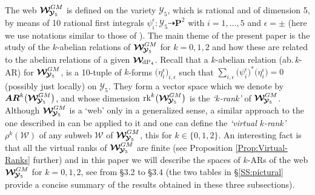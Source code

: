 \documentclass[11pt]{amsart}
\newcommand{\mk}{\medskip}
\begin{document}
  The web $ \boldsymbol{\mathcal W}^{GM}_{ \hspace{-0.05cm}
\boldsymbol{\mathcal Y}_5}$ is defined on the 
variety $\boldsymbol{\mathcal Y}_5$, which is rational and of dimension 5, by means of 10 rational first integrals 
$\psi_i^{\epsilon}: \boldsymbol{\mathcal Y}_5\dashrightarrow  \mathbf P^2$ with $i=1,\ldots,5$ and $\epsilon=\pm $ (here we use notations similar to those of \cite{PirioAFST}).  The main theme of the present paper is the study of the $k$-abelian relations of $ \boldsymbol{\mathcal W}^{GM}_{ \hspace{-0.05cm}
\boldsymbol{\mathcal Y}_5}$ for $k=0,1,2$ and how these are related to the abelian relations of a given $\boldsymbol{\mathcal W}_{  \hspace{-0.05cm}{\rm dP}_4}$.  
 Recall that a $k$-abelian relation (ab.\,$k$-AR) for $ \boldsymbol{\mathcal W}^{GM}_{ \hspace{-0.05cm} \boldsymbol{\mathcal Y}_5}$, is a 10-tuple of $k$-forms $\big( \eta_{i}^\epsilon\big)_{i,\epsilon}$ such that 
$\sum_{i,\epsilon} \big(\psi_i^{\epsilon}\big)^* \big( 
\eta_{i}^\epsilon \big)=0$  (possibly just locally) on $\boldsymbol{\mathcal Y}_5$.
They form a vector space which we denote by $\boldsymbol{AR}^{k}\big( 
 \boldsymbol{\mathcal W}^{GM}_{ \hspace{-0.05cm}
\boldsymbol{\mathcal Y}_5}\big)$, and whose dimension ${\rm rk}^k\big( 
 \boldsymbol{\mathcal W}^{GM}_{ \hspace{-0.05cm}
\boldsymbol{\mathcal Y}_5}\big)$ is the {\it `$k$-rank'} of 
$\boldsymbol{\mathcal W}^{GM}_{ \hspace{-0.05cm}
\boldsymbol{\mathcal Y}_5}$.  %
Although $ \boldsymbol{\mathcal W}^{GM}_{ \hspace{-0.05cm}
\boldsymbol{\mathcal Y}_5}$ is a `web' only in a generalized sense, 
a similar approach to the one described in \cite[\S1.3.4]{ClusterWebs} can be applied to it and  one can define the {\it `virtual $k$-rank'} $\rho^{k}(\boldsymbol{\mathcal W})$ of any subweb $\boldsymbol{\mathcal W}$ of $ \boldsymbol{\mathcal W}^{GM}_{ \hspace{-0.05cm}
\boldsymbol{\mathcal Y}_5}$, this for $k\in \{0,1,2\}$. An interesting fact is that all the virtual ranks of $ \boldsymbol{\mathcal W}^{GM}_{ \hspace{-0.05cm}
\boldsymbol{\mathcal Y}_5}$ are finite (see Proposition \ref{Prop:Virtual-Ranks} further) and in this paper we will describe the spaces of $k$-ARs  of the web $ \boldsymbol{\mathcal W}^{GM}_{ \hspace{-0.05cm} \boldsymbol{\mathcal Y}_5}$ for $k=0,1, 2$, see from \S3.2 to \S3.4 (the two tables in \S\ref{SS:pictural} provide a concise summary of the results obtained in these three subsections). 
\mk 
\end{document}
